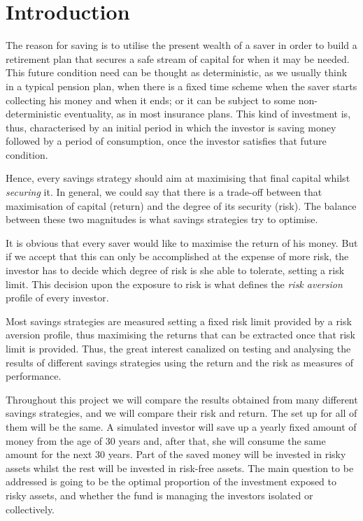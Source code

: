\section{Introduction}

The reason for saving is to utilise the present wealth of a saver in order to build a retirement plan that secures a safe stream of capital for when it may be needed. This future condition need can be thought as deterministic, as we usually think in a typical pension plan, when there is a fixed time scheme when the saver starts collecting his money and when it ends; or it can be subject to some non-deterministic eventuality, as in most insurance plans. This kind of investment is, thus, characterised by an initial period in which the investor is saving money followed by a period of consumption, once the investor satisfies that future condition.

Hence, every savings strategy should aim at maximising that final capital whilst \textit{securing} it. In general, we could say that there is a trade-off between that maximisation of capital (return) and the degree of its security (risk). The balance between these two magnitudes is what savings strategies try to optimise.

It is obvious that every saver would like to maximise the return of his money. But if we accept that this can only be accomplished at the expense of more risk, the investor has to decide which degree of risk is she able to tolerate, setting a risk limit. This decision upon the exposure to risk is what defines the \textit{risk aversion} profile of every investor.

Most savings strategies are measured setting a fixed risk limit provided by a risk aversion profile, thus maximising the returns that can be extracted once that risk limit is provided. Thus, the great interest canalized on testing and analysing the results of different savings strategies using the return and the risk as measures of performance.


Throughout this project we will compare the results obtained from many different savings strategies, and we will compare their risk and return. The set up for all of them will be the same. A simulated investor will save up a yearly fixed amount of money from the age of 30 years and, after that, she will consume the same amount for the next 30 years. Part of the saved money will be invested in risky assets whilst the rest will be invested in risk-free assets. The main question to be addressed is going to be the optimal proportion of the investment exposed to risky assets, and whether the fund is managing the investors isolated or collectively.

